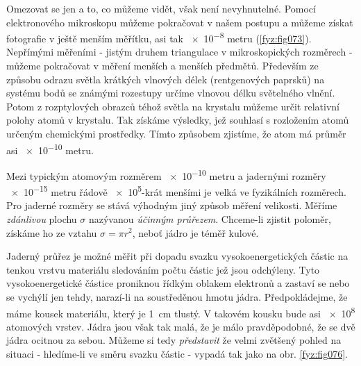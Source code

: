     Omezovat se jen a to, co můžeme vidět, však není  nevyhnutelné. Pomocí elektronového mikroskopu 
    můžeme pokračovat v našem postupu a můžeme získat fotografie v ještě menším měřítku, asi tak 
    \num{e-8} metru  (\ref{fyz:fig073}). Nepřímými měřeními - jistým druhem triangulace v 
    mikroskopických rozměrech - můžeme pokračovat v měření menších a menších předmětů. Především ze 
    způsobu odrazu světla krátkých vlnových délek (rentgenových paprsků) na systému bodů se známými 
    rozestupy určíme vlnovou délku světelného vlnění. Potom z rozptylových obrazců téhož světla na 
    krystalu můžeme určit relativní polohy atomů v krystalu. Tak získáme výsledky, jež souhlasí s 
    rozložením atomů určeným chemickými prostředky. Tímto způsobem zjistíme, že atom má průměr asi 
    \num{e-10} metru. 

    Mezi typickým atomovým rozměrem \num{e-10} metru a jadernými rozměry \num{e-15} metru řádově 
    \num{e5}-krát menšími je velká  ve fyzikálních rozměrech. Pro jaderné rozměry se 
    stává výhodným jiný způsob měření velikosti. Měříme \emph{zdánlivou} plochu \(\sigma\) 
    nazývanou \emph{účinným průřezem}. Chceme-li zjistit poloměr, získáme ho ze vztahu \(\sigma = 
    \pi r^2\), neboť jádro je téměř kulové. 

    Jaderný průřez je možné měřit při dopadu svazku vysokoenergetických částic na tenkou vrstvu 
    materiálu sledováním počtu částic jež jsou odchýleny. Tyto vysokoenergetické částice  proniknou 
    řídkým oblakem elektronů a zastaví se nebo se vychýlí jen tehdy, narazí-li na soustředěnou 
    hmotu jádra. Předpokládejme, že máme kousek materiálu, který je \SI{1}{\cm} tlustý. V takovém 
    kousku bude asi \num{e8} atomových vrstev. Jádra jsou však tak malá, že je málo pravděpodobné, 
    že se dvě jádra ocitnou za sebou. Můžeme si tedy \emph{představit} že velmi zvětšený pohled na 
    situaci - hledíme-li ve směru svazku částic - vypadá tak jako na obr. \ref{fyz:fig076}. 

